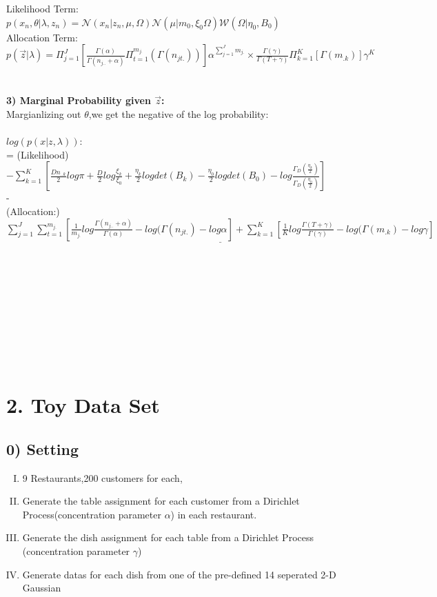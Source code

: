 \documentclass{article}
\begin{document}
\begin{spacing}{1.1}
Likelihood Term:\\ 
$p(x_{n},\theta|\lambda,z_{n})=\mathcal{N}(x_{n}|z_{n},\mu,\Omega)
\mathcal{N}(\mu|m_{0},\xi_{0}\Omega)\mathcal{W}(\Omega|\eta_{0},B_{0})$\\ 
Allocation Term:\\ 
$p(\vec z|\lambda)=\Pi_{j=1}^{J}[\frac{\Gamma(\alpha)}{\Gamma(n_{j..}+\alpha)}\Pi_{t=1}^{m_{j.}}(\Gamma(n_{jt.}))]\alpha^{\sum_{j=1}^{J}m_{j.}}
\times \frac{\Gamma(\gamma)}{\Gamma(T+\gamma)}\Pi_{k=1}^{K} [\Gamma(m_{.k})] \gamma^{K}$ \\ \\ \\
\large {\bf 3) Marginal Probability given $\vec z$:}\\
Margianlizing out $\theta$,we get the negative of the log probability:\\ \\
 $log(p(x|z,\lambda))$:\\=
(Likelihood)$ -\sum_{k=1}^{K} [\frac{D n_{..k}}{2}log\pi+\frac{D}{2}log\frac{\xi_{k}}{\xi_{0}}+\frac{\eta_{k}}{2}log det(B_{k})-\frac{\eta_{0}}{2}log det(B_{0})
-log \frac{\Gamma_{D}(\frac{\eta_{k}}{2})}{\Gamma_{D}(\frac{\eta_{0}}{2})}]$
\\
-
\\
(Allocation:)$\underline{\sum_{j=1}^{J}\sum_{t=1}^{m_{j.}}[\frac{1}{m_{j.}}log \frac{\Gamma(n_{j..}+\alpha)}{\Gamma(\alpha)} -log(\Gamma(n_{jt.})-log \alpha]+
 \sum_{k=1}^{K} [\frac{1}{K}log \frac{\Gamma(T+\gamma)}{\Gamma(\gamma)} -log(\Gamma(m_{.k})-log \gamma]}$
\\ \\ \\ \\ \\ \\ \\ \\ \\ \\
\section{2. Toy Data Set}

\subsection{0) Setting}

\begin{enumerate}[(I)]
\item 9 Restaurants,200 customers for each,
\item Generate the table assignment for each customer from a Dirichlet Process(concentration parameter $\alpha$) in each restaurant.
\item Generate the dish assignment for each table from a Dirichlet Process (concentration parameter $\gamma$)
\item Generate datas for each dish from one of the pre-defined 14 seperated 2-D Gaussian 
\end{enumerate}

\end{spacing}
\end{document}
